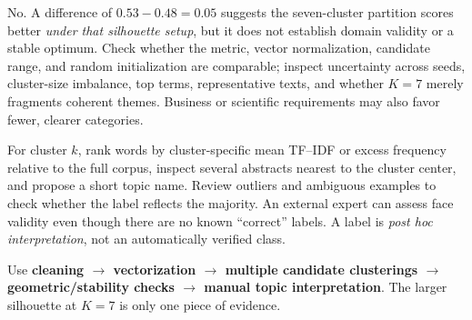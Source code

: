 No. A difference of $\boxed{0.53-0.48=0.05}$ suggests the seven-cluster partition scores better \emph{under that silhouette setup}, but it does not establish domain validity or a stable optimum. Check whether the metric, vector normalization, candidate range, and random initialization are comparable; inspect uncertainty across seeds, cluster-size imbalance, top terms, representative texts, and whether $K=7$ merely fragments coherent themes. Business or scientific requirements may also favor fewer, clearer categories.

For cluster $k$, rank words by cluster-specific mean TF--IDF or excess frequency relative to the full corpus, inspect several abstracts nearest to the cluster center, and propose a short topic name. Review outliers and ambiguous examples to check whether the label reflects the majority. An external expert can assess face validity even though there are no known ``correct'' labels. A label is \emph{post hoc interpretation}, not an automatically verified class.
\begin{answer}
Use \textbf{cleaning $\to$ vectorization $\to$ multiple candidate clusterings $\to$ geometric/stability checks $\to$ manual topic interpretation}. The larger silhouette at $K=7$ is only one piece of evidence.
\end{answer}
